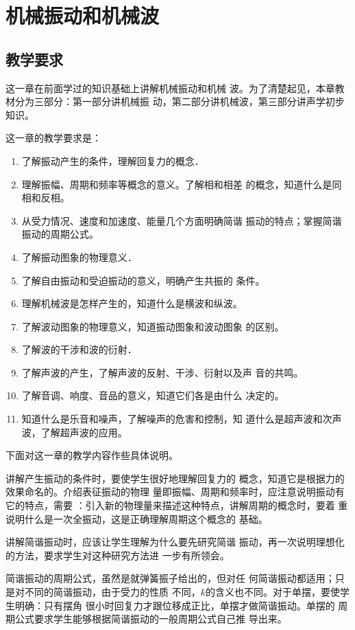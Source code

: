 
\chapter{机械振动和机械波}
\minitoc[n]
\section{教学要求}


这一章在前面学过的知识基础上讲解机械振动和机械
波。为了清楚起见，本章教材分为三部分：第一部分讲机械振
动，第二部分讲机械波，第三部分讲声学初步知识。

这一章的教学要求是：
\begin{enumerate}
\item 了解振动产生的条件，理解回复力的概念．
\item 理解振幅、周期和频率等概念的意义。了解相和相差
的概念，知道什么是同相和反相。
\item 从受力情况、速度和加速度、能量几个方面明确简谐
振动的特点；掌握简谐振动的周期公式。
\item 了解振动图象的物理意义．
\item 了解自由振动和受迫振动的意义，明确产生共振的
条件。
\item 理解机械波是怎样产生的，知道什么是横波和纵波。
\item 了解波动图象的物理意义，知道振动图象和波动图象
的区别。
\item 了解波的干涉和波的衍射．
\item 了解声波的产生，了解声波的反射、干涉、衍射以及声
音的共鸣。
\item 了解音调、响度、音品的意义，知道它们各是由什么
决定的。
\item 知道什么是乐音和噪声，了解噪声的危害和控制，知
道什么是超声波和次声波，了解超声波的应用。
\end{enumerate}

下面对这一章的教学内容作些具体说明。

讲解产生振动的条件时，要使学生很好地理解回复力的
概念，知道它是根据力的效果命名的。介绍表征振动的物理
量即振幅、周期和频率时，应注意说明振动有它的特点，需要
：引入新的物理量来描述这种特点，讲解周期的概念时，要着
重说明什么是一次全振动，这是正确理解周期这个概念的
基础。

讲解简谐振动时，应该让学生理解为什么要先研究简谐
振动，再一次说明理想化的方法，要求学生对这种研究方法进
一步有所领会。

简谐振动的周期公式，虽然是就弹簧振子给出的，但对任
何简谐振动都适用；只是对不同的简谐振动，由于受力的性质
不同，$k$的含义也不同。对于单摆，要使学生明确：只有摆角
很小时回复力才跟位移成正比，单摆才做简谐振动。单摆的
周期公式要求学生能够根据简谐振动的一般周期公式自己推
导出来。

